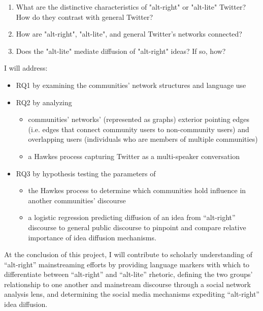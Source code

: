 \documentclass[acmlarge, screen, authorversion]{acmart}
\begin{document}
\begin{enumerate}[font={\bfseries},label={{RQ}\arabic*.}]
    \item What are the distinctive characteristics of "alt-right" or "alt-lite" Twitter? How do they contrast with general Twitter?\label{}
    
    \item How are "alt-right", "alt-lite", and general Twitter's networks connected?\
    
    \item Does the "alt-lite" mediate diffusion of "alt-right" ideas? If so, how?
\end{enumerate}

I will address:
\begin{itemize}
    \item RQ1 by examining the communities’ network structures and language use
    \item RQ2 by analyzing
    \begin{itemize}
        \item communities’ networks’ (represented as graphs) exterior pointing edges
(i.e. edges that connect community users to non-community users) and
overlapping users (individuals who are members of multiple communities)
        \item a Hawkes process capturing Twitter as a multi-speaker
conversation
    \end{itemize}
\item RQ3 by hypothesis testing the parameters of
\begin{itemize}
    \item the Hawkes
process to determine which communities hold influence in another
communities’ discourse
\item a logistic regression predicting diffusion of an idea from
``alt-right” discourse to general public discourse to pinpoint and compare relative importance of idea diffusion mechanisms.
\end{itemize}
\end{itemize}

At the conclusion of this project, I will contribute to scholarly understanding of ``alt-right'' mainstreaming efforts by providing language markers with which to differentiate between ``alt-right'' and ``alt-lite'' rhetoric, defining the two groups' relationship to one another and mainstream discourse through a social network analysis lens, and 
 determining the social media mechanisms expediting ``alt-right'' idea diffusion.
 
\end{document}

